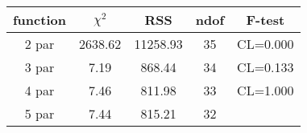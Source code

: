 \begin{tabular}{c|c|c|c|c}
function & $\chi^2$ & RSS & ndof & F-test \\
\hline
2 par & 2638.62 & 11258.93 & 35 & CL=0.000 \\
3 par & 7.19 & 868.44 & 34 & CL=0.133 \\
4 par & 7.46 & 811.98 & 33 & CL=1.000 \\
5 par & 7.44 & 815.21 & 32 & \\
\hline
\end{tabular}